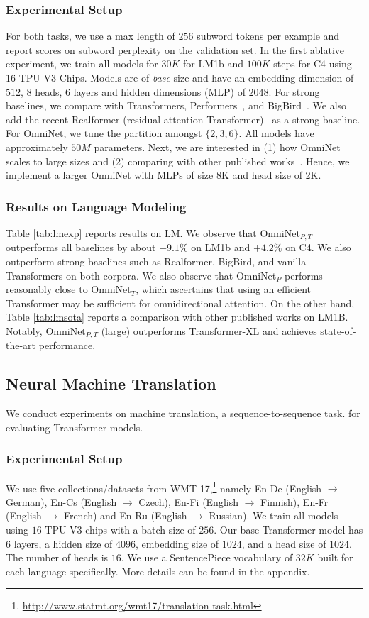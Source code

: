 \documentclass{article}
\begin{document}
\subsubsection{Experimental Setup} 
For both tasks, we use a max length of $256$ subword tokens per example and report scores on subword perplexity on the validation set. In the first ablative experiment, we train all models for $30K$ for LM1b and $100K$ steps for C4 using 16 TPU-V3 Chips. Models are of \textit{base} size and have an embedding dimension of $512$, $8$ heads, $6$ layers and hidden dimensions (MLP) of $2048$. For strong baselines, we compare with Transformers, Performers~\citep{choromanski2020rethinking}, and BigBird~\citep{zaheer2020big}. We also add the recent Realformer (residual attention Transformer)~\citep{he2020realformer} as a strong baseline. For OmniNet, we tune the partition amongst $\{2,3,6\}$. All models have approximately $50M$ parameters. Next, we are interested in (1) how OmniNet scales to large sizes and (2) comparing with other published works~\citep{dai2019transformer}. Hence, we implement a larger OmniNet with MLPs of size 8K and head size of 2K. 
\subsubsection{Results on Language Modeling} 
Table \ref{tab:lmexp} reports results on LM.  We observe that OmniNet$_{P,T}$ outperforms all baselines by about $+9.1\%$ on LM1b and $+4.2\%$ on C4. We also outperform strong baselines such as Realformer, BigBird, and vanilla Transformers on both corpora. We also observe that OmniNet$_P$ performs reasonably close to OmniNet$_T$, which ascertains that using an efficient Transformer may be sufficient for omnidirectional attention. On the other hand, Table \ref{tab:lmsota} reports a comparison with other published works on LM1B. Notably, OmniNet$_{P,T}$ (large) outperforms Transformer-XL and achieves state-of-the-art performance. 


\subsection{Neural Machine Translation}
We conduct experiments on machine translation, a sequence-to-sequence task. for evaluating Transformer models. 
\subsubsection{Experimental Setup} 
We use five collections/datasets from WMT-17,\footnote{\url{http://www.statmt.org/wmt17/translation-task.html}} namely En-De (English $\rightarrow$ German), En-Cs (English $\rightarrow$ Czech), En-Fi (English $\rightarrow$ Finnish), En-Fr (English $\rightarrow$ French) and En-Ru (English $\rightarrow$ Russian). We train all models using $16$ TPU-V3 chips with a batch size of $256$. Our base Transformer model has 6 layers, a hidden size of $4096$, embedding size of $1024$, and a head size of $1024$. The number of heads is $16$. We use a SentencePiece \citep{kudo2018sentencepiece} vocabulary of $32K$ built for each language specifically. More details can be found in the appendix.
\end{document}
